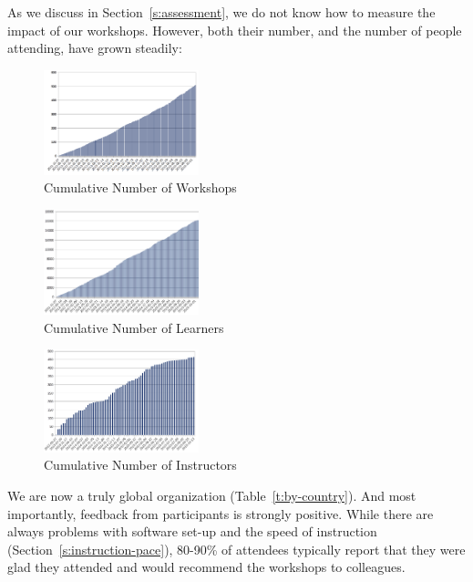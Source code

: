 \documentclass[10pt,a4paper,twocolumn]{article}
\begin{document}
As we discuss in Section~\ref{s:assessment}, we do not know how to
measure the impact of our workshops.  However, both their number, and
the number of people attending, have grown steadily:

\begin{figure}
\centering
\includegraphics[width=0.4\textwidth]{workshops.png}
\caption{Cumulative Number of Workshops}
\label{f:workshops}
\end{figure}

\begin{figure}
\centering
\includegraphics[width=0.4\textwidth]{learners.png}
\caption{Cumulative Number of Learners}
\label{f:enrolment}
\end{figure}

\begin{figure}
\centering
\includegraphics[width=0.4\textwidth]{instructors.png}
\caption{Cumulative Number of Instructors}
\label{f:instructors}
\end{figure}

We are now a truly global organization (Table~\ref{t:by-country}).
And most importantly, feedback from participants is strongly positive.
While there are always problems with software set-up and the speed of
instruction (Section~\ref{s:instruction-pace}), 80-90\% of attendees
typically report that they were glad they attended and would recommend
the workshops to colleagues.
\end{document}
